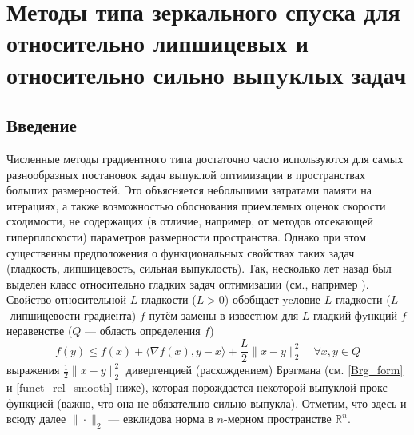 \chapter{Методы типа зеркального спyска для относительно липшицевых и относительно сильно выпyклых задач}\label{ch:ch2}

\section{Введение}\label{sec:ch2/sec1}

    Численные методы градиентного типа достаточно часто используются для самых разнообразных постановок задач выпуклой оптимизации в пространствах больших размерностей. Это объясняется небольшими затратами памяти на итерациях, а также возможностью обоснования приемлемых оценок скорости сходимости, не содержащих (в отличие, например, от методов отсекающей гиперплоскости) параметров размерности пространства. Однако при этом существенны предположения о функциональных свойствах таких задач (гладкость, липшицевость, сильная выпуклость). Так, несколько лет назад был выделен класс относительно гладких задач оптимизации (см., например \cite{Bauschke,Drag,Lu_Nesterov_2018}). Свойство относительной $L$-гладкости ($L > 0$) обобщает ycловие $L$-гладкости ($L$-липшицевости градиента)  $f$ путём замены в известном для $L$-гладкий фyнкций $f$ неравенстве ($Q$ --- область определения $f$)
    $$
    	f(y) \leq f(x) + \langle \nabla{f(x)}, y - x \rangle  + \frac{L}{2} \|x - y \|_2^2 \quad   \forall x, y \in Q
    $$	
    выражения $\frac{1}{2} \|x - y \|_2^2 $ дивергенцией (расхождением) Брэгмана (см. \eqref{Brg_form} и \eqref{funct_rel_smooth} ниже), которая порождается некоторой выпуклой прокс-функцией (важно, что она не обязательно сильно выпукла). Отметим, что здесь и всюду далее $\|\cdot\|_2$ --- евклидова норма в $n$-мерном пространстве $\mathbb{R}^n$.

